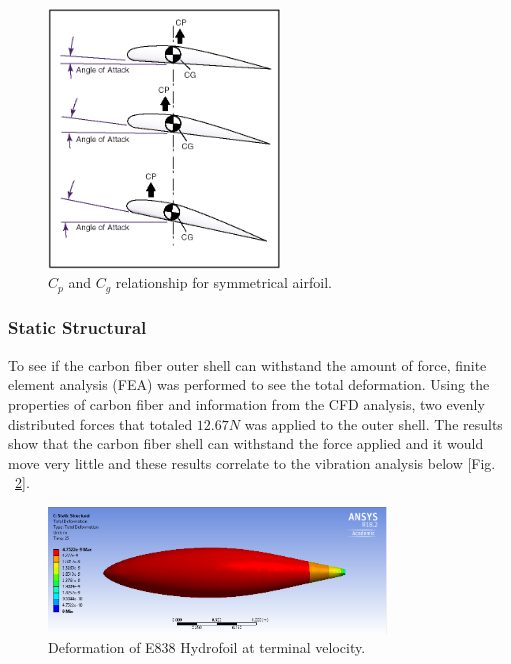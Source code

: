 \begin{figure}[H]
	\centering
    \includegraphics[width=0.55\textwidth]{Aeroshell/CP_angle_of_attack.png}
    \caption{\label{fig:cpcg}$C_p$ and $C_g$ relationship for symmetrical airfoil.}
\end{figure}

\subsubsection*{Static Structural}
\indent\indent To see if the carbon fiber outer shell can withstand the amount of force, finite element analysis (FEA) was performed to see the total deformation. Using the properties of carbon fiber and information from the CFD analysis, two evenly distributed forces that totaled $12.67 N$ was applied to the outer shell. The results show that the carbon fiber shell can withstand the force applied and it would move very little and these results correlate to the vibration analysis below [Fig. ~\ref{fig:deformation}].

\begin{figure}[H]
	\centering
    \includegraphics[width=0.8\textwidth]{Aeroshell/deform.PNG}
    \caption{\label{fig:deformation}Deformation of E838 Hydrofoil at terminal velocity.}
\end{figure}

